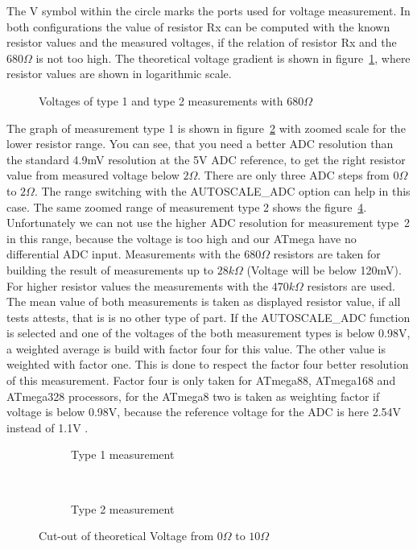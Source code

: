 The V symbol within the circle marks the ports used for voltage measurement.
In both configurations the value of resistor Rx can be computed with the known
resistor values and the measured voltages, if the relation of resistor Rx and the \(680\Omega\) is not too high.
The theoretical voltage gradient is shown in figure~\ref{fig:RLvtot}, where resistor values are shown in logarithmic scale.
\begin{figure}[H]
\centering

\caption{Voltages of type 1 and type 2 measurements with \(680\Omega\) }
\label{fig:RLvtot}
\end{figure}
The graph of measurement type 1 is shown in figure~\ref{fig:RLvlow} with zoomed scale for the lower resistor range.
You can see, that you need a better ADC resolution than the standard 4.9mV resolution at the 5V ADC reference, to get
the right resistor value from measured voltage below \(2\Omega\).
There are only three ADC steps from \(0\Omega\) to \(2\Omega\).
The range switching with the AUTOSCALE\_ADC option can help in this case.
The same zoomed range of measurement type 2 shows the figure~\ref{fig:RLvhigh}.
Unfortunately we can not use the higher ADC resolution for measurement type~2 in this range,
 because the voltage is too high and our ATmega have no differential ADC input.
Measurements with the \(680\Omega\) resistors are taken for building the result of measurements up to \(28k\Omega\)
(Voltage will be below 120mV).
For higher resistor values the measurements with the \(470k\Omega\) resistors are used. The mean value of both
measurements is taken as displayed resistor value, if all tests attests, that is is no other type of part.
If the AUTOSCALE\_ADC function is selected and one of the voltages of the both measurement types is below 0.98V,
a weighted average is build with factor four for this value. The other value is weighted with factor one.
This is done to respect the factor four better resolution of this measurement. Factor four is only taken for ATmega88,
ATmega168 and ATmega328 processors, for the ATmega8 two is taken as weighting factor if voltage is below 0.98V,
because the reference voltage for the ADC is here 2.54V instead of 1.1V .

\begin{figure}[H]
  \begin{subfigure}[b]{9cm}
    \centering
    \resizebox{9cm}{!}{}
    \caption{Type 1 measurement}
    \label{fig:RLvlow}
  \end{subfigure}
  ~
  \begin{subfigure}[b]{9cm}
    \centering
    \resizebox{9cm}{!}{}
    \caption{Type 2 measurement}
    \label{fig:RLvhigh}
  \end{subfigure}
  \caption{Cut-out of theoretical Voltage from \(0\Omega\) to \(10\Omega\)}
\end{figure}


